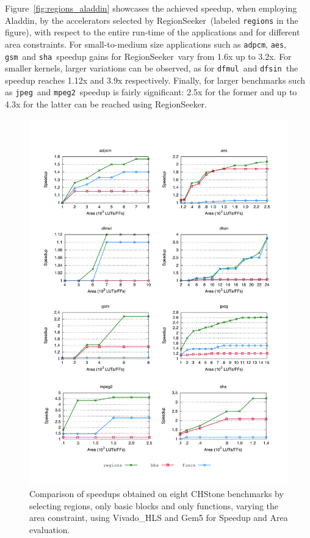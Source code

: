 \documentclass[]{usiinfthesis}
\newcommand{\rseeker}{{RegionSeeker}}
\newcommand{\adpcm}{\texttt{adpcm}}
\newcommand{\sha}{\texttt{sha}}
\newcommand{\jpeg}{\texttt{jpeg}}
\newcommand{\mpeg}{\texttt{mpeg2}}
\newcommand{\aes}{\texttt{aes}}
\newcommand{\dfmul}{\texttt{dfmul}}
\newcommand{\dfsin}{\texttt{dfsin}}
\newcommand{\gsm}{\texttt{gsm}}
\begin{document}
Figure~\ref{fig:regions_aladdin} showcases the achieved
speedup, when employing Aladdin, by the accelerators selected by
\rseeker\ (labeled \texttt{regions} in the figure), with respect to
the entire run-time of the applications and for different area
constraints.  For small-to-medium size applications such as \adpcm,
\aes, \gsm\ and \sha\ speedup gains for \rseeker\ vary from 1.6x up to
3.2x. For smaller kernels, larger variations can be observed, as for
\dfmul\ and \dfsin\ the speedup reaches 1.12x and 3.9x respectively.
Finally, for larger benchmarks such as \jpeg\ and \mpeg\, speedup is
fairly significant: 2.5x for the former and up to 4.3x for the latter
can be reached using \rseeker.\par

\begin{figure}[h!]
\centering
\hspace*{-1cm}
\includegraphics[width= 1.1 \linewidth]{figs/regions_vivado}
\caption{Comparison of speedups obtained on eight CHStone benchmarks
  by selecting regions, only basic blocks and only functions, varying
  the area constraint, using Vivado\_HLS and Gem5 for Speedup and Area evaluation.}
\label{fig:regions_vivado}
\end{figure}
\end{document}
